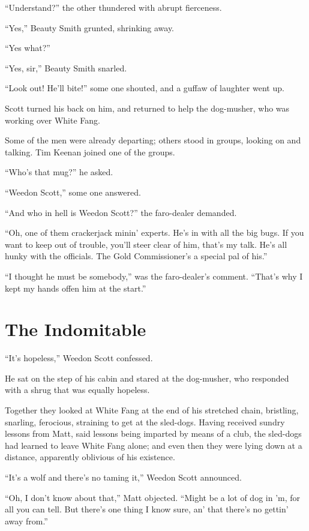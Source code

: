 \documentclass[10pt]{book}
\begin{document}
“Understand?” the other thundered with abrupt fierceness.

“Yes,” Beauty Smith grunted, shrinking away.

“Yes what?”

“Yes, sir,” Beauty Smith snarled.

“Look out! He’ll bite!” some one shouted, and a guffaw of laughter went
up.

Scott turned his back on him, and returned to help the dog-musher, who
was working over White Fang.

Some of the men were already departing; others stood in groups, looking
on and talking. Tim Keenan joined one of the groups.

“Who’s that mug?” he asked.

“Weedon Scott,” some one answered.

“And who in hell is Weedon Scott?” the faro-dealer demanded.

“Oh, one of them crackerjack minin’ experts. He’s in with all the big
bugs. If you want to keep out of trouble, you’ll steer clear of him,
that’s my talk. He’s all hunky with the officials. The Gold
Commissioner’s a special pal of his.”

“I thought he must be somebody,” was the faro-dealer’s comment. “That’s
why I kept my hands offen him at the start.”

\chapter{The Indomitable}

“It’s hopeless,” Weedon Scott confessed.

He sat on the step of his cabin and stared at the dog-musher, who
responded with a shrug that was equally hopeless.

Together they looked at White Fang at the end of his stretched chain,
bristling, snarling, ferocious, straining to get at the sled-dogs.
Having received sundry lessons from Matt, said lessons being imparted
by means of a club, the sled-dogs had learned to leave White Fang
alone; and even then they were lying down at a distance, apparently
oblivious of his existence.

“It’s a wolf and there’s no taming it,” Weedon Scott announced.

“Oh, I don’t know about that,” Matt objected. “Might be a lot of dog in
’m, for all you can tell. But there’s one thing I know sure, an’ that
there’s no gettin’ away from.”
\end{document}
